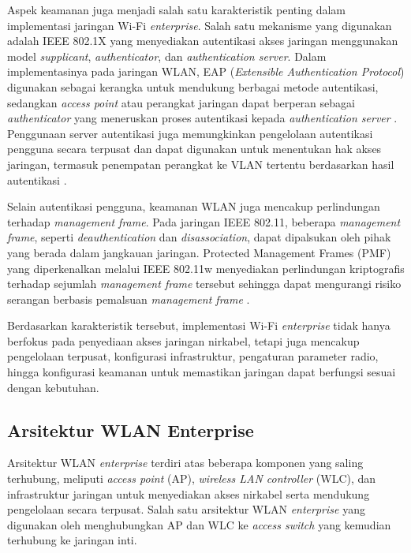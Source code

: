 Aspek keamanan juga menjadi salah satu karakteristik penting dalam implementasi jaringan Wi-Fi \textit{enterprise}. Salah satu mekanisme yang digunakan adalah IEEE 802.1X yang menyediakan autentikasi akses jaringan menggunakan model \textit{supplicant}, \textit{authenticator}, dan \textit{authentication server}. Dalam implementasinya pada jaringan WLAN, EAP (\textit{Extensible Authentication Protocol}) digunakan sebagai kerangka untuk mendukung berbagai metode autentikasi, sedangkan \textit{access point} atau perangkat jaringan dapat berperan sebagai \textit{authenticator} yang meneruskan proses autentikasi kepada \textit{authentication server} \parencite{RFC3748,RFC3580}. Penggunaan server autentikasi juga memungkinkan pengelolaan autentikasi pengguna secara terpusat dan dapat digunakan untuk menentukan hak akses jaringan, termasuk penempatan perangkat ke VLAN tertentu berdasarkan hasil autentikasi \parencite{RFC3580}.

Selain autentikasi pengguna, keamanan WLAN juga mencakup perlindungan terhadap \textit{management frame}. Pada jaringan IEEE 802.11, beberapa \textit{management frame}, seperti \textit{deauthentication} dan \textit{disassociation}, dapat dipalsukan oleh pihak yang berada dalam jangkauan jaringan. Protected Management Frames (PMF) yang diperkenalkan melalui IEEE 802.11w menyediakan perlindungan kriptografis terhadap sejumlah \textit{management frame} tersebut sehingga dapat mengurangi risiko serangan berbasis pemalsuan \textit{management frame} \parencite{CISCO_80211W_2024}.

Berdasarkan karakteristik tersebut, implementasi Wi-Fi \textit{enterprise} tidak hanya berfokus pada penyediaan akses jaringan nirkabel, tetapi juga mencakup pengelolaan terpusat, konfigurasi infrastruktur, pengaturan parameter radio, hingga konfigurasi keamanan untuk memastikan jaringan dapat berfungsi sesuai dengan kebutuhan.

\subsection{Arsitektur WLAN Enterprise}

Arsitektur WLAN \textit{enterprise} terdiri atas beberapa komponen yang saling terhubung, meliputi \textit{access point} (AP), \textit{wireless LAN controller} (WLC), dan infrastruktur jaringan untuk menyediakan akses nirkabel serta mendukung pengelolaan secara terpusat. Salah satu arsitektur WLAN \textit{enterprise} yang digunakan oleh \textcite{RUCKUS_PRODUCT_GUIDE_2018} menghubungkan AP dan WLC ke \textit{access switch} yang kemudian terhubung ke jaringan inti.

